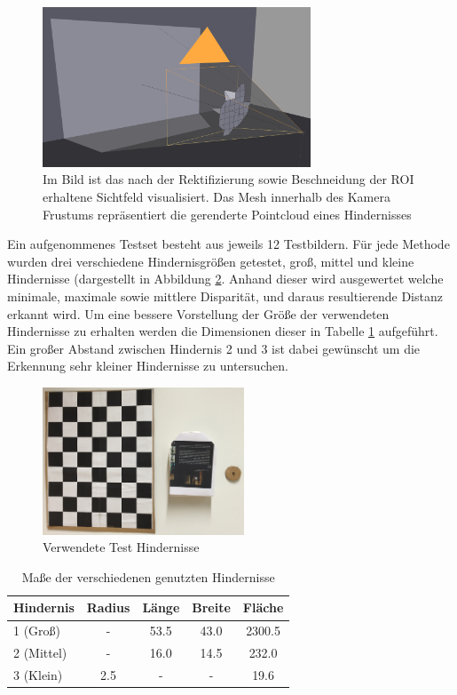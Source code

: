 	\begin{figure}[h]
		\centering
		\includegraphics[width=8cm]{img/viewport}
		\caption{Im Bild ist das nach der Rektifizierung sowie Beschneidung der ROI erhaltene Sichtfeld visualisiert. Das Mesh innerhalb des Kamera Frustums repräsentiert die gerenderte Pointcloud eines Hindernisses}
		\label{fig:field_of_view}
	\end{figure}

\noindent
Ein aufgenommenes Testset besteht aus jeweils 12 Testbildern. Für jede Methode wurden drei verschiedene Hindernisgrößen getestet, groß, mittel und kleine Hindernisse (dargestellt in Abbildung \ref{fig:test_obstacles}. Anhand dieser wird ausgewertet welche minimale, maximale sowie mittlere Disparität, und daraus resultierende Distanz erkannt wird. Um eine bessere Vorstellung der Größe der verwendeten Hindernisse zu erhalten werden die Dimensionen dieser in Tabelle \ref{tbl:obstacle_sizes} aufgeführt. Ein großer Abstand zwischen Hindernis 2 und 3 ist dabei gewünscht um die Erkennung sehr kleiner Hindernisse zu untersuchen. \\

\begin{figure}[h]
	\centering
	\includegraphics[width=6cm]{img/test_obstacles}
	\caption{Verwendete Test Hindernisse}
	\label{fig:test_obstacles}
\end{figure}

\begin{table}[h]
\centering
\begin{tabular}{|l|c|c|c|c|}
\hline
Hindernis   & Radius & Länge & Breite & Fläche \\
\hline
1 (Groß)   	&   -    & 53.5  & 43.0   & 2300.5 \\
\hline
2 (Mittel) 	& 	-    & 16.0  & 14.5   & 232.0\\
\hline
3 (Klein)	&  2.5	 &   -   &   -    & 19.6 \\
\hline	
\end{tabular}
\caption{Maße der verschiedenen genutzten Hindernisse}
\label{tbl:obstacle_sizes}
\end{table}

